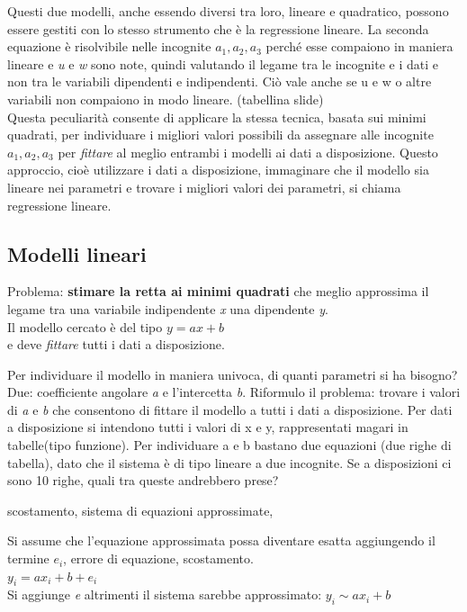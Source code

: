 \documentclass[10pt,a4paper]{article}
\begin{document}
Questi due modelli, anche essendo diversi tra loro, lineare e quadratico, possono essere gestiti con lo stesso strumento che è la regressione lineare.
La seconda equazione è risolvibile nelle incognite $  a_{1}, a_{2}, a_{3}$ perché esse compaiono in maniera lineare e \textit{u} e \textit{w} sono note, quindi valutando il legame tra le incognite e i dati e non tra le variabili dipendenti e indipendenti. Ciò vale anche se u e w o altre variabili non compaiono in modo lineare. (tabellina slide)\\
Questa peculiarità consente di applicare la stessa tecnica, basata sui minimi quadrati, per individuare i migliori valori possibili da assegnare alle incognite $ a_{1}, a_{2}, a_{3} $ per \textit{fittare} al meglio entrambi i modelli ai dati a disposizione. Questo approccio, cioè utilizzare i dati a disposizione, immaginare che il modello sia lineare nei parametri e trovare i migliori valori dei parametri, si chiama regressione lineare.

\subsection{Modelli lineari}
Problema: \textbf{stimare la retta ai minimi quadrati} che meglio approssima il legame tra una variabile indipendente \textit{x} una dipendente \textit{y}.\\
Il modello cercato è del tipo $ y=ax+b $\\
e deve \textit{fittare} tutti i dati a disposizione.

Per individuare il modello in maniera univoca, di quanti parametri si ha bisogno?
Due: coefficiente angolare \textit{a} e l'intercetta \textit{b}. Riformulo il problema: trovare i valori di \textit{a} e \textit{b} che consentono di fittare il modello a tutti i dati a disposizione. Per dati a disposizione si intendono tutti i valori di x e y, rappresentati magari in tabelle(tipo funzione).
Per individuare a e b bastano due equazioni (due righe di tabella), dato che il sistema è di tipo lineare a due incognite. 
Se a disposizioni ci sono 10 righe, quali tra queste andrebbero prese?

scostamento, sistema di equazioni approssimate, 

Si assume che l'equazione approssimata possa diventare esatta aggiungendo il termine $e_{i}$, errore di equazione, scostamento.\\

$ y_{i}=ax_{i}+b+e_{i} $\\
Si aggiunge \textit{e} altrimenti il sistema sarebbe approssimato: $ y_{i} \sim ax_{i}+b $
\end{document}

